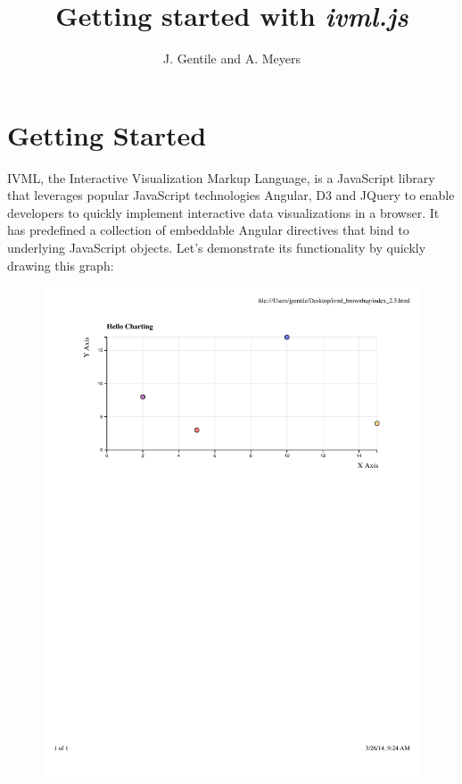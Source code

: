 \documentclass[a4paper,10pt-]{article}
\begin{document}
\title{Getting started with \emph{ivml.js}}
\author{J. Gentile and A. Meyers}

\maketitle

\section{Getting Started}

IVML, the Interactive Visualization Markup Language, is a JavaScript library that leverages popular JavaScript technologies Angular, D3 and JQuery to enable developers to quickly implement interactive data visualizations in a browser.
It has predefined a collection of embeddable Angular directives that bind to underlying
JavaScript objects. Let's demonstrate its functionality by quickly drawing this
graph:

\begin{figure}[!htb]
\centering
\includegraphics[scale=.6]{Images/HelloWorld.pdf}
\label{scatterplot}
\end{figure}
\end{document}
